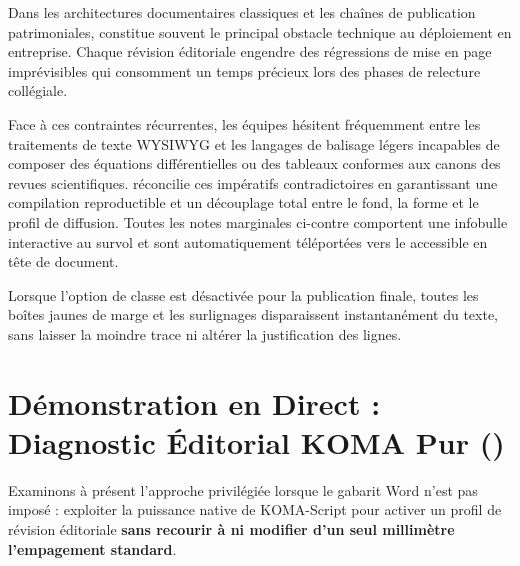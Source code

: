 \begin{WordGeometry}
Dans les architectures documentaires classiques et les chaînes de publication patrimoniales,
constitue souvent le principal obstacle technique au déploiement en entreprise.
Chaque révision éditoriale engendre des régressions de mise en page imprévisibles
qui consomment un temps précieux lors des phases de relecture collégiale.

Face à ces contraintes récurrentes, les équipes hésitent fréquemment entre les traitements de texte WYSIWYG
et les langages de balisage légers incapables de composer des équations différentielles ou des tableaux conformes aux canons des revues scientifiques.
réconcilie ces impératifs contradictoires en garantissant une compilation reproductible
et un découplage total entre le fond, la forme et le profil de diffusion.
Toutes les notes marginales ci-contre comportent une infobulle interactive au survol
et sont automatiquement téléportées vers le 
accessible en tête de document.

\begin{callout}
Lorsque l'option de classe  est désactivée pour la publication finale,
toutes les boîtes jaunes de marge et les surlignages disparaissent instantanément du texte,
sans laisser la moindre trace ni altérer la justification des lignes.
\end{callout}

\end{WordGeometry}

\activerStyleDebug

\section[Diagnostic Éditorial KOMA \& ThesisDebug]{Démonstration en Direct : Diagnostic Éditorial KOMA Pur ()}
\label{sec:demo-geometrie-annotation}

Examinons à présent l'approche privilégiée lorsque le gabarit Word n'est pas imposé :
exploiter la puissance native de KOMA-Script pour activer un profil de révision éditoriale
\textbf{sans recourir à  ni modifier d'un seul millimètre l'empagement standard}.

